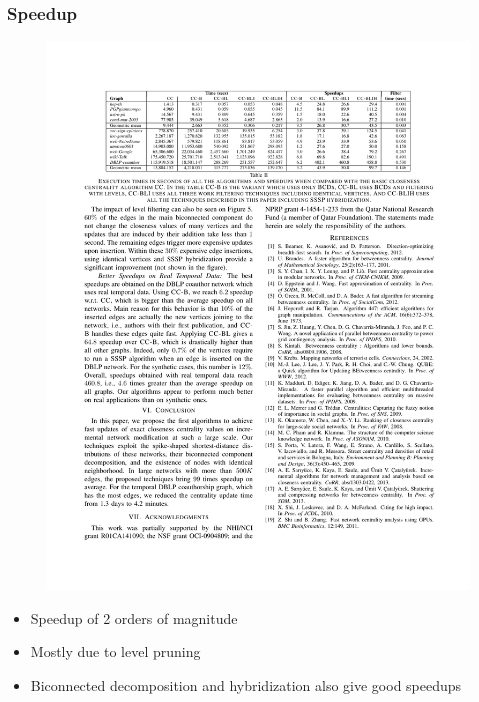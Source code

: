 \begin{frame}
  \frametitle{Speedup}

  \begin{figure}[H]
    \centering
    \includegraphics[width=\textwidth, height=0.5\textheight, keepaspectratio]{imgs/sksc-results2}
  \end{figure}

  \begin{itemize}
    \item Speedup of 2 orders of magnitude
    \item Mostly due to level pruning
    \item Biconnected decomposition and hybridization also give good speedups
  \end{itemize}
\end{frame}
